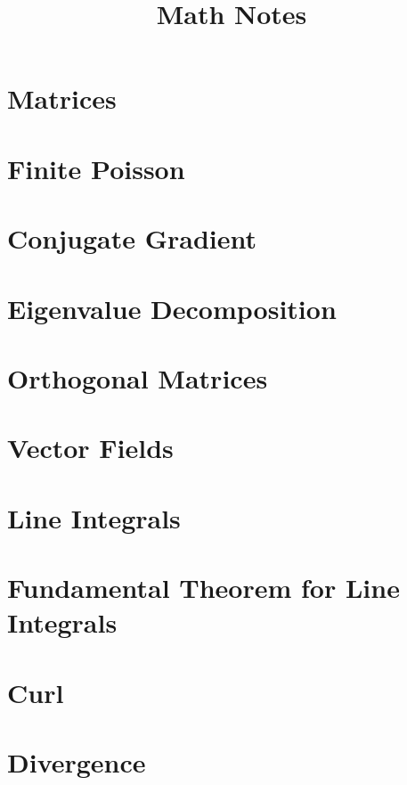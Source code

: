 \documentclass{article}
\theoremstyle{definition}
\begin{document}
\title{Math Notes}
\maketitle
\tableofcontents
\newpage

\section{Matrices}


\section{Finite Poisson}


\section{Conjugate Gradient}


\section{Eigenvalue Decomposition}


\section{Orthogonal Matrices}


\section{Vector Fields}


\section{Line Integrals}

\section{Fundamental Theorem for Line Integrals}


\section{Curl}


\section{Divergence}

\end{document}
